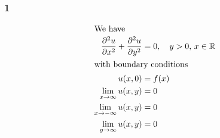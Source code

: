 \documentclass[a4paper]{article}
\newcommand{\ex}[1]{\subsubsection*{#1}}
\begin{document}
\pagestyle{fancy} %


\ex{1}

\begin{align}
    \intertext{We have}
    \frac{\partial^2u}{\partial x^2} + \frac{\partial^2u}{\partial y^2} &= 0
        ,\quad y>0, \, x \in \mathbb{R} \label{eq:1-PDE}\\
    \intertext{with boundary conditions}
    u(x,0) &= f(x) \\
    \lim_{x\to\infty} u(x,y) &= 0 \label{eq:1-bound-x-inf}\\
    \lim_{x\to-\infty} u(x,y) &= 0 \label{eq:1-bound-xinf}\\
    \lim_{y\to\infty} u(x,y) &= 0 \label{eq:1-bound-yinf}\\
\end{align}
\end{document}
